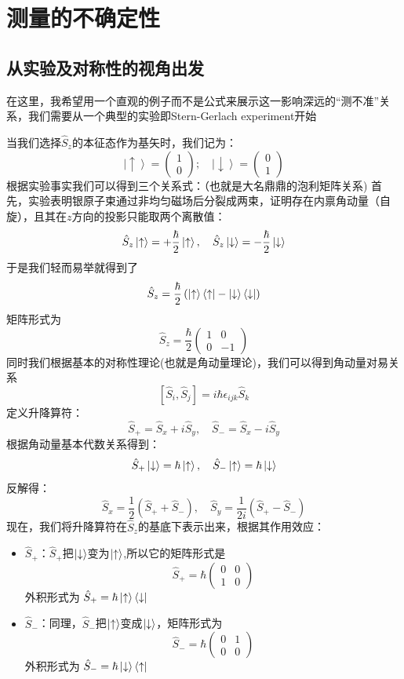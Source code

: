 \section{测量的不确定性}
\subsection{从实验及对称性的视角出发}
在这里，我希望用一个直观的例子而不是公式来展示这一影响深远的“测不准”关系，我们需要从一个典型的实验即Stern-Gerlach experiment开始\par
当我们选择${\hat S_z}$的本征态作为基矢时，我们记为：
\[
\left|  \uparrow  \right\rangle  = \left( {\begin{array}{*{20}{c}}
		1\\
		0
\end{array}} \right);\quad \left|  \downarrow  \right\rangle  = \left( {\begin{array}{*{20}{c}}
		0\\
		1
\end{array}} \right)
\]
根据实验事实我们可以得到三个关系式：（也就是大名鼎鼎的泡利矩阵关系)
首先，实验表明银原子束通过非均匀磁场后分裂成两束，证明存在内禀角动量（自旋），且其在$z$方向的投影只能取两个离散值：
\[
\hat{S}_z \ket{\uparrow} = +\frac{\hbar}{2} \ket{\uparrow}, \quad \hat{S}_z \ket{\downarrow} = -\frac{\hbar}{2} \ket{\downarrow}
\]
于是我们轻而易举就得到了
\[
\hat{S}_z = \frac{\hbar}{2} \left( \ket{\uparrow}\bra{\uparrow} - \ket{\downarrow}\bra{\downarrow} \right)
\]
矩阵形式为
\[
\hat{S}_z = \frac{\hbar}{2} \begin{pmatrix} 1 & 0 \\ 0 & -1 \end{pmatrix}
\]
同时我们根据基本的对称性理论(也就是角动量理论)，我们可以得到角动量对易关系
\[
[\hat{S}_i, \hat{S}_j] = i\hbar \epsilon_{ijk} \hat{S}_k
\]
定义升降算符：
\begin{equation*}
	\hat{S}_+ = \hat{S}_x + i\hat{S}_y, \quad \hat{S}_- = \hat{S}_x - i\hat{S}_y 
\end{equation*}
根据角动量基本代数关系得到：
\[\hat{S}_+ \ket{\downarrow} = \hbar \ket{\uparrow}, \quad \hat{S}_- \ket{\uparrow} = \hbar \ket{\downarrow}\]
反解得：
\[
\hat{S}_x = \frac{1}{2}(\hat{S}_+ + \hat{S}_-), \quad \hat{S}_y = \frac{1}{2i}(\hat{S}_+ - \hat{S}_-)
\]
现在，我们将升降算符在${{\hat S}_z}$的基底下表示出来，根据其作用效应：
\begin{itemize}
	\item $\hat {S}_ + $：$\hat {S}_ + $把$\ket{\downarrow}$变为$\ket{\uparrow}$,所以它的矩阵形式是
	\[
	\hat{S}_+ = \hbar \begin{pmatrix} 0 & 0 \\ 1 & 0 \end{pmatrix}
	\]
	外积形式为 $\hat{S}_+ =\hbar \ket{\uparrow}\bra{\downarrow} $	
	
	\item $\hat {S}_ - $：同理，$\hat {S}_ - $把$\ket{\uparrow}$变成$\ket{\downarrow}$，矩阵形式为
	\[
	\hat{S}_- = \hbar \begin{pmatrix} 0 & 1 \\ 0 & 0 \end{pmatrix}
	\]
	外积形式为 $\hat{S}_- =\hbar \ket{\downarrow}\bra{\uparrow}$
\end{itemize}
